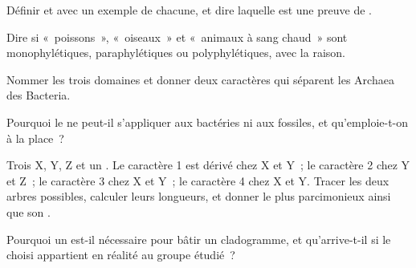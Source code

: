 \begin{exercise}[$\star$]\label{exo:b1:classifying-biodiversity:2}
Définir  et  avec un exemple de chacune, et dire
laquelle est une preuve de .
\end{exercise}

\begin{exercise}[$\star$]\label{exo:b1:classifying-biodiversity:3}
Dire si «~poissons~», «~oiseaux~» et «~animaux à sang chaud~» sont
monophylétiques, paraphylétiques ou polyphylétiques, avec la raison.
\end{exercise}

\begin{exercise}[$\star$]\label{exo:b1:classifying-biodiversity:4}
Nommer les trois domaines et donner deux caractères qui séparent les
Archaea des Bacteria.
\end{exercise}

\begin{exercise}[$\star\star$]\label{exo:b1:classifying-biodiversity:5}
Pourquoi le  ne peut-il s'appliquer aux
bactéries ni aux fossiles, et qu'emploie-t-on à la place~?
\end{exercise}

\begin{exercise}[$\star\star$]\label{exo:b1:classifying-biodiversity:6}
Trois  X, Y, Z et un . Le caractère 1 est dérivé
chez X et Y~; le caractère 2 chez Y et Z~; le caractère 3 chez X et Y~;
le caractère 4 chez X et Y. Tracer les deux arbres possibles, calculer
leurs longueurs, et donner le plus parcimonieux ainsi que son
.
\end{exercise}

\begin{exercise}[$\star\star$]\label{exo:b1:classifying-biodiversity:7}
Pourquoi un  est-il nécessaire pour bâtir un
cladogramme, et qu'arrive-t-il si le  choisi appartient
en réalité au groupe étudié~?
\end{exercise}


